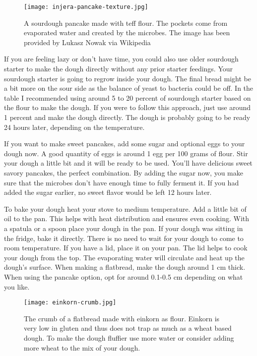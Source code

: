 \begin{figure}[htb!]
  \texttt{[image: injera-pancake-texture.jpg]}
  \centering
  \caption{A sourdough pancake made with teff flour. The pockets come from
  evaporated water and  created by the microbes.
  The image has been provided by Lukasz Nowak via Wikipedia}
\end{figure}

If you are feeling lazy or don't have time, you could also use older sourdough starter
to make the dough directly without any prior starter feedings. Your sourdough starter
is going to regrow inside your dough. The
final bread might be a bit more on the sour side as the balance of yeast to
bacteria could be off. In the table I recommended using around 5 to 20 percent
of sourdough starter based on the flour to make the dough. If you were to follow
this approach, just use around 1 percent and make the dough directly.
The dough is probably going to be ready 24 hours later, depending on the temperature.

If you want to make sweet pancakes, add some sugar and optional eggs to your dough
now. A good quantity of eggs is around 1 egg per 100 grams of flour.
Stir your dough a little bit and it will be ready to be used. You'll
have delicious sweet savory pancakes, the perfect combination. By
adding the sugar now, you make sure that the microbes don't have
enough time to fully ferment it. If you had added the sugar
earlier, no sweet flavor would be left 12 hours later.

To bake your dough heat your stove to medium temperature. Add a little bit of
oil to the pan. This helps with heat distribution and ensures even cooking.
With a spatula or a spoon place your dough in the pan. If your dough
was sitting in the fridge, bake it directly. There is no need to wait for your
dough to come to room temperature. If you have a lid,
place it on your pan. The lid helps to cook your dough from the top.
The evaporating water will circulate and heat up the dough's surface. When
making a flatbread, make the dough around 1 cm thick. When using the pancake
option, opt for around 0.1-0.5 cm depending on what you like.

\begin{figure}[htb!]
  \texttt{[image: einkorn-crumb.jpg]}
  \centering
  \caption{The crumb of a flatbread made with einkorn as flour. Einkorn
  is very low in gluten and thus does not trap as much  as a wheat based
  dough. To make the dough fluffier use more water or consider adding
  more wheat to the mix of your dough.}
\end{figure}

